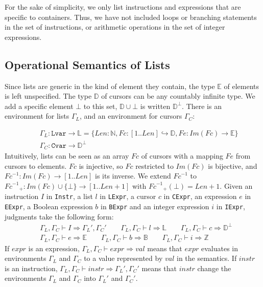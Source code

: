 \documentclass[runningheads,a4paper]{llncs}
\newcommand{\envL}{\ensuremath{\Gamma_L}\xspace}
\newcommand{\envC}{\ensuremath{\Gamma_C}\xspace}
\newcommand{\eval}{\envL, \envC \vdash}
\newcommand{\Fc}{\ensuremath{\mathit{Fc}}\xspace}
\newcommand{\FcInv}{\ensuremath{\mathit{Fc}^{-1}}\xspace}
\newcommand{\Fe}{\ensuremath{\mathit{Fe}}\xspace}
\newcommand{\ImFc}{\ensuremath{\mathit{Im}(\Fc)}\xspace}
\newcommand{\TypL}{\ensuremath{\mathbb{L}}\xspace}
\newcommand{\TypE}{\ensuremath{\mathbb{E}}\xspace}
\newcommand{\TypD}{\ensuremath{\mathbb{D}}\xspace}
\newcommand{\Nat}{\ensuremath{\mathbb{N}}\xspace}
\newcommand{\Int}{\ensuremath{\mathbb{Z}}\xspace}
\newcommand{\Bool}{\ensuremath{\mathbb{B}}\xspace}
\newcommand{\Len}{\ensuremath{\mathit{Len}}\xspace}
\newcommand{\beforesub}{\vspace{-0.2cm}}
\newcommand{\aftersub}{\vspace{-0.1cm}}
\begin{document}
For the sake of simplicity, we only list instructions and expressions that are
specific to containers. Thus, we have not included loops or branching
statements in the set of instructions, or arithmetic operations in the set of
integer expressions.

\beforesub
\subsection{Operational Semantics of Lists}
\aftersub

Since lists are generic in the kind of element they contain, the type \TypE of
elements is left unspecified. The type \TypD of cursors can be any countably infinite type.
We add a specific element $\bot$ to this set, $\TypD\cup\bot$ is written $\TypD^\bot$.
There is an environment for lists \envL, and an
environment for cursors \envC:

\begin{eqnarray*}
&&\envL : \texttt{Lvar} \rightarrow \TypL = \{\Len
: \Nat, \Fc : [1 .. \Len] \hookrightarrow \TypD, \Fe : \ImFc
\rightarrow \TypE\} \\
&&\envC : \texttt{Cvar} \rightarrow \TypD^\bot
\end{eqnarray*}
Intuitively, lists can be seen as an array $\Fc$ of cursors with a mapping
$\Fe$ from cursors to elements. \Fc is injective, so \Fc restricted to \ImFc is
bijective, and $\FcInv:\ImFc \rightarrow[1 .. \Len]$ is its inverse. We
extend \FcInv to $\FcInv_+: \ImFc\cup \{\bot\} \rightarrow [1 .. \Len+1]$
with $\FcInv_+(\bot)=\Len+1$.
Given an instruction $I$ in \texttt{Instr}, a list $l$ in \texttt{LExpr}, a
cursor $c$ in \texttt{CExpr}, an expression $e$ in \texttt{EExpr}, a Boolean
expression $b$ in \texttt{BExpr} and an integer expression $i$ in
\texttt{IExpr}, judgments take the following form:
\begin{eqnarray*}
&\eval I \Rightarrow \envL',\envC'
\qquad \eval l \Rightarrow \TypL
\qquad \eval c \Rightarrow \TypD^\bot\\
&\eval e \Rightarrow \TypE
\qquad \eval b \Rightarrow\Bool
\qquad \eval i \Rightarrow\Int
\end{eqnarray*}
If $\mathit{expr}$ is an expression, $\eval \mathit{expr} \Rightarrow \mathit{val}$
means that $\mathit{expr}$ evaluates in environments $\envL$ and $\envC$ to a
value represented by $\mathit{val}$ in the semantics.
If $\mathit{instr}$ is an instruction, $\eval \mathit{instr} \Rightarrow \envL',\envC'$
means that $instr$ change the environments $\envL$ and $\envC$ into $\envL'$ and $\envC'$.
\end{document}
